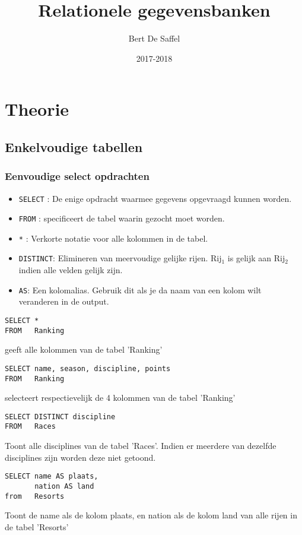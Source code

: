 \documentclass[12pt]{report}
\title{Relationele gegevensbanken}
\author{Bert De Saffel}
\date{2017-2018}
\newcommand{\sepline}{ \noindent{\rule{\linewidth}{0.4pt}}}
\begin{document}
\maketitle
\tableofcontents

\part{Theorie}
\chapter{Enkelvoudige tabellen}
\section{Eenvoudige select opdrachten}
\begin{itemize}
 \item \texttt{SELECT} : De enige opdracht waarmee gegevens opgevraagd kunnen worden.
 \item \texttt{FROM} : specificeert de tabel waarin gezocht moet worden.
 \item \texttt{*} : Verkorte notatie voor alle kolommen in de tabel.
 \item \texttt{DISTINCT}: Elimineren van meervoudige gelijke rijen. Rij$_1$ is gelijk aan 
 Rij$_2$ indien alle velden gelijk zijn. 
 \item \texttt{AS}: Een kolomalias. Gebruik dit als je da naam van een kolom wilt veranderen in de output.
\end{itemize}

\sepline
\begin{verbatim}
SELECT *
FROM   Ranking
\end{verbatim}
geeft alle kolommen van de tabel 'Ranking'


\sepline
\begin{verbatim}
SELECT name, season, discipline, points
FROM   Ranking
\end{verbatim}
selecteert respectievelijk de 4 kolommen van de tabel 'Ranking'


\sepline
\begin{verbatim}
SELECT DISTINCT discipline
FROM   Races
\end{verbatim}
Toont alle disciplines van de tabel 'Races'. Indien er meerdere van dezelfde disciplines zijn worden deze niet getoond.

\sepline
\begin{verbatim}
SELECT name AS plaats,
       nation AS land
from   Resorts
\end{verbatim}
Toont de name als de kolom plaats, en nation als de kolom land van alle rijen in de tabel 'Resorts'
\end{document}

